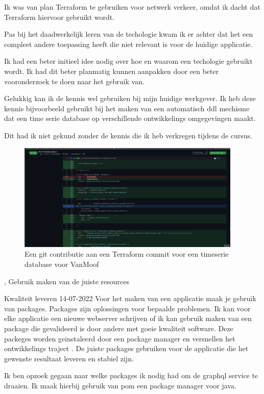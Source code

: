 {{{			Ik was van plan Terraform te gebruiken voor netwerk verkeer, omdat ik dacht dat Terraform hiervoor gebruikt wordt.

			Pas bij het daadwerkelijk leren van de techologie kwam ik er achter dat het een compleet andere toepassing heeft die niet relevant is voor de huidige applicatie.
		}
		{%

			Ik had een beter initieel idee nodig over hoe en waarom een techologie gebruikt wordt.
			Ik had dit beter planmatig kunnen aanpakken door een beter vooronderzoek te doen naar het gebruik van.

			Gelukkig kan ik de kennis wel gebruiken bij mijn huidige werkgever.
			Ik heb deze kennis bijvoorbeeld gebruikt bij het maken van een automatisch ddl mechisme dat een time serie database op verschillende ontwikkelings omgegevingen maakt.

			Dit had ik niet gekund zonder de kennis die ik heb verkregen tijdens de cursus.
		}
		{
		}
	}
	{%

		\begin{figure}[H]
			\begin{center}
				\includegraphics[width=0.95\textwidth]{images/timeseries.png}
			\end{center}
			\caption{Een git contributie aan een Terraform commit voor een timeserie database voor VanMoof}
			\label{fig:terraformcommit}
		\end{figure}

	},
	\bewijs
	{%
		Gebruik maken van de juiste resources
	}
	{%
		\starr
		{%
			Kwaliteit leveren
		}
		{%
			14-07-2022
		}
		{%
			Voor het maken van een applicatie maak je gebruik van packages.
			Packages zijn oplossingen voor bepaalde problemen. Ik kan voor elke applicatie een nieuwe webserver schrijven of ik kan gebruik maken van een package die gevalideerd is door andere met goeie kwaliteit software.
			Deze packeges worden geinstaleerd door een package manager en versnellen het ontwikkelings traject .
		}
		{%
			De juiste packages gebruiken voor de applicatie die het gewenste resultaat leveren en stabiel zijn.
		}
		{%
			Ik ben opzoek gegaan naar welke packages ik nodig had om de graphql service te draaien.
			Ik maak hierbij gebruik van pom een package manager voor java.

}}}
